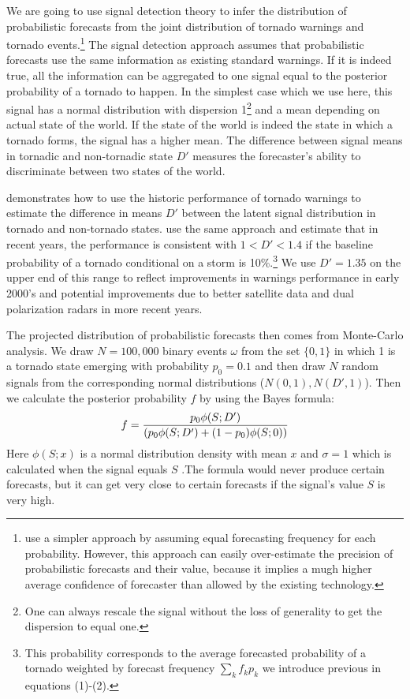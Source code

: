 \documentclass{ametsocV6.1}
\begin{document}
We are going to use signal detection theory to infer the distribution of probabilistic forecasts from the joint distribution of tornado warnings and tornado events.\footnote{\citet{howard_firm_2021} use a simpler approach by assuming equal forecasting frequency for each probability. However, this approach can easily over-estimate the precision of probabilistic forecasts and their value, because it implies a mugh higher average confidence of forecaster than allowed by the existing technology.} The signal detection approach assumes that probabilistic forecasts use the same information as existing standard warnings. If it is indeed true, all the information can be aggregated to one signal equal to the posterior probability of a tornado to happen. In the simplest case which we use here, this signal has a normal distribution with dispersion 1\footnote{One can always rescale the signal without the loss of generality to get the dispersion to equal one.} and a mean depending on actual state of the world. If the state of the world is indeed the state in which a tornado forms, the signal has a higher mean. The difference between signal means in tornadic and non-tornadic state $D'$ measures the forecaster's ability to discriminate between two states of the world.

\citet{brooks_tornado-warning_2004} demonstrates how to use the historic performance of tornado warnings to estimate the difference in means $D'$ between the latent signal distribution in tornado and non-tornado states. \citet{brooks_long-term_2018} use the same approach and estimate that in recent years, the performance is consistent with $1<D'<1.4$ if the baseline probability of a tornado conditional on a storm is 10\%.\footnote{This probability corresponds to the average forecasted probability of a tornado weighted by forecast frequency $\sum_k f_k p_k$ we introduce previous in equations (1)-(2).} We use $D'=1.35$ on the upper end of this range to reflect improvements in warnings performance in early 2000's and potential improvements due to better satellite data and dual polarization radars in more recent years. 

The projected distribution of probabilistic forecasts then comes from Monte-Carlo analysis. We draw $N=100,000$ binary events $\omega$ from the set $\{0,1\}$ in which 1 is a tornado state emerging with probability $p_0=0.1$ and then draw $N$ random signals from the corresponding normal distributions ($N(0,1),N(D',1)$). Then we calculate the posterior probability $f$ by using the Bayes formula:
\begin{equation}
 f={p_0\phi(S;D')\over (p_0\phi(S;D')+(1-p_0)\phi(S;0))}
 \end{equation}
Here  $\phi(S;x)$ is a normal distribution density with mean $x$ and $\sigma=1$ which is calculated when the signal equals $S$ .The formula would never produce certain forecasts, but it can get very close to certain forecasts if the signal's value $S$ is very high.
 
\end{document}
